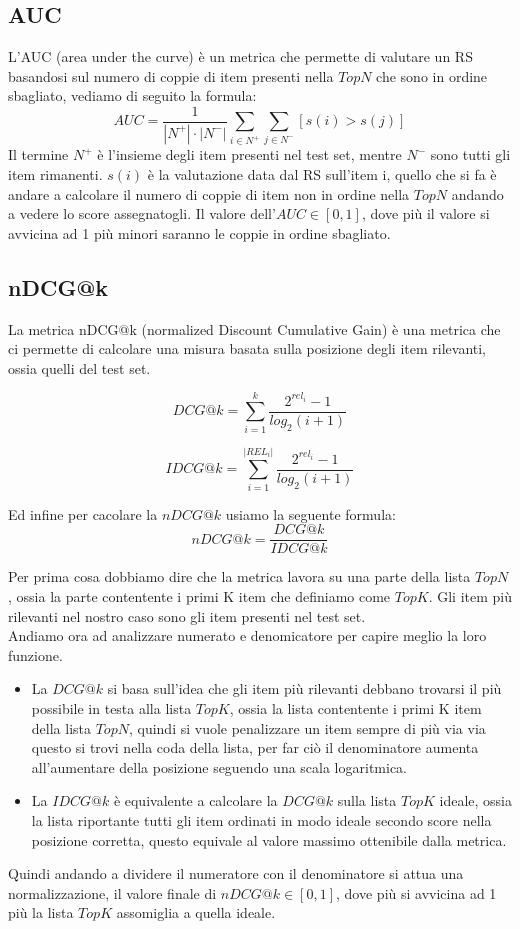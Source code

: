 \subsection{AUC}
L'AUC (area under the curve) è un metrica che permette di valutare un RS basandosi sul numero di coppie di item presenti nella $TopN$ che sono in ordine sbagliato, vediamo di seguito la formula:
$$AUC = \frac{1}{|N^{+}|\cdot|N^{-}|}\sum_{i \in N^{+}} \sum_{j \in N^{-}} [s(i) > s(j)]$$
Il termine $N^{+}$ è l'insieme degli item presenti nel test set, mentre $N^{-}$ sono tutti gli item rimanenti. $s(i)$ è la valutazione data dal RS sull'item i, quello che si fa è andare a calcolare il numero di coppie di item non in ordine nella $TopN$ andando a vedere lo score assegnatogli.
Il valore dell'$AUC \in [0,1]$, dove più il valore si avvicina ad 1 più minori saranno le coppie in ordine sbagliato.

\subsection{nDCG@k}
La metrica nDCG@k (normalized Discount Cumulative Gain) è una metrica che ci permette di calcolare una misura basata sulla posizione degli item rilevanti, ossia quelli del test set.

\begin{minipage}[H]{0.5\textwidth}
	$$DCG@k = \sum_{i=1}^{k} \frac{2^{rel_i} - 1}{log_{2} (i + 1)}$$
\end{minipage}
\begin{minipage}[H]{0.5\textwidth}
	$$IDCG@k = \sum_{i=1}^{|REL_i|} \frac{2^{rel_i} - 1}{log_{2} (i + 1)}$$
\end{minipage}


Ed infine per cacolare la $nDCG@k$ usiamo la seguente formula:
$$nDCG@k = \frac{DCG@k}{IDCG@k}$$

Per prima cosa dobbiamo dire che la metrica lavora su una parte della lista $TopN$, ossia la parte contentente i primi K item che definiamo come $TopK$. Gli item più rilevanti nel nostro caso sono gli item presenti nel test set.\\
Andiamo ora ad analizzare numerato e denomicatore per capire meglio la loro funzione.
\begin{itemize}
	\item La $DCG@k$ si basa sull'idea che gli item più rilevanti debbano trovarsi il più possibile in testa alla lista $TopK$, ossia la lista contentente i primi K item della lista $TopN$, quindi si vuole penalizzare un item sempre di più via via questo si trovi nella coda della lista, per far ciò il denominatore aumenta all'aumentare della posizione seguendo una scala logaritmica. 
	\item La $IDCG@k$ è equivalente a calcolare la $DCG@k$ sulla lista $TopK$ ideale, ossia la lista riportante tutti gli item ordinati in modo ideale secondo score nella posizione corretta, questo equivale al valore massimo ottenibile dalla metrica. 
\end{itemize}

Quindi andando a dividere il numeratore con il denominatore si attua una normalizzazione, il valore finale di $nDCG@k \in [0,1]$, dove più si avvicina ad 1 più la lista $TopK$ assomiglia a quella ideale.